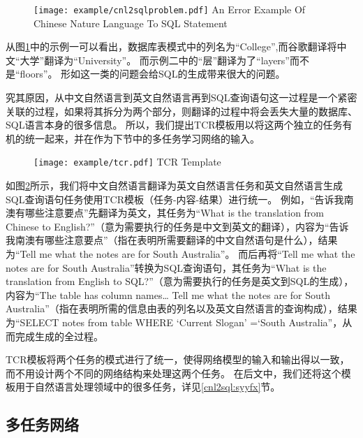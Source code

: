 \begin{figure}[!htp]
    \centering
    \texttt{[image: example/cnl2sqlproblem.pdf]}
      {An Error Example Of Chinese Nature Language To SQL Statement}
    \label{fig:cnl2sqlproblem}
  \end{figure}

从图\ref{fig:cnl2sqlproblem}中的示例一可以看出，数据库表模式中的列名为“College”,而谷歌翻译将中文“大学”翻译为“University”。
而示例二中的“层”翻译为了“layers”而不是“floors”。
形如这一类的问题会给SQL的生成带来很大的问题。

究其原因，从中文自然语言到英文自然语言再到SQL查询语句这一过程是一个紧密关联的过程，如果将其拆分为两个部分，则翻译的过程中将会丢失大量的数据库、SQL语言本身的很多信息。
所以，我们提出TCR模板用以将这两个独立的任务有机的统一起来，并在作为下节中的多任务学习网络的输入。

\begin{figure}[!htp]
    \centering
    \texttt{[image: example/tcr.pdf]}
      {TCR Template}
    \label{fig:cnl2sqltcr}
  \end{figure}

如图\ref{fig:cnl2sqltcr}所示，我们将中文自然语言翻译为英文自然语言任务和英文自然语言生成SQL查询语句任务使用TCR模板（任务-内容-结果）进行统一。
例如，“告诉我南澳有哪些注意要点”先翻译为英文，其任务为“What is the translation from Chinese to English?”（意为需要执行的任务是中文到英文的翻译），内容为“告诉我南澳有哪些注意要点”（指在表明所需要翻译的中文自然语句是什么），结果为“Tell me what the notes are for South Australia”。
而后再将“Tell me what the notes are for South Australia”转换为SQL查询语句，其任务为“What is the translation from English to SQL?”（意为需要执行的任务是英文到SQL的生成），内容为“The table has column names… Tell me what the notes are for South Australia”（指在表明所需的信息由表的列名以及英文自然语言的查询构成），结果为“SELECT notes from table WHERE ‘Current Slogan’ =‘South Australia”，从而完成生成的全过程。

TCR模板将两个任务的模式进行了统一，使得网络模型的输入和输出得以一致，而不用设计两个不同的网络结构来处理这两个任务。
在后文中，我们还将这个模板用于自然语言处理领域中的很多任务，详见\ref{cnl2sql:syyfx}节。

\subsection{多任务网络}

